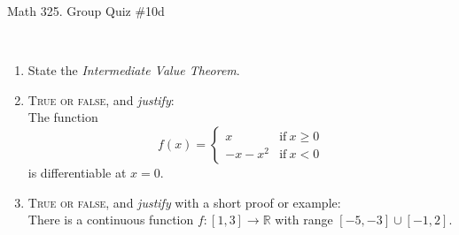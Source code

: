 \documentclass[12pt]{amsart}
\newcommand{\R}{\mathbb{R}}
\begin{document}
	
	\thispagestyle{empty}
	
	\begin{center}
		\Large{Math 325. Group Quiz \#10d }\\

	\end{center}
	
	\
	
\begin{enumerate}
		\item State the \textit{Intermediate Value Theorem}. 
		\vfill
		\vfill

\item  \textsc{True or false}, and \emph{justify}:\\
 The function 
 \[ f(x) = \begin{cases}  x & \text{if} \ x\geq 0 \\ -x - x^2 & \text{if} \ x<0 \end{cases}\]
	is differentiable at $x=0$.
	
\vfill	\vfill\vfill


\newpage	



	
	\item  \textsc{True or false}, and \emph{justify} with a short proof or example:\\
There is a continuous function $f: [1,3] \to \R$ with range $[-5,-3] \cup [-1,2]$.




	


	

\vfill\vfill\vfill





\end{enumerate}


	
\end{document}
